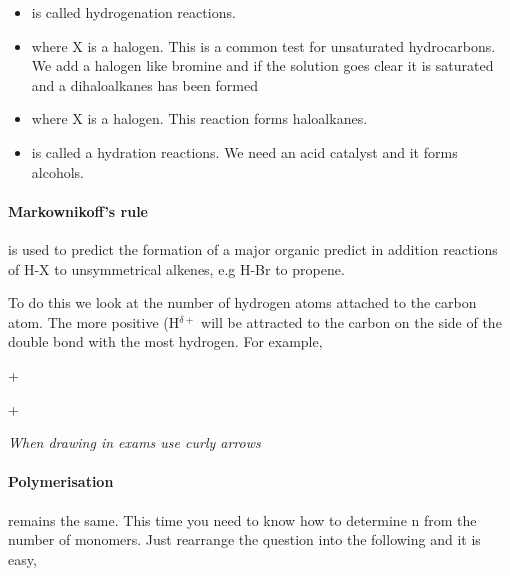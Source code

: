 	\begin{itemize}
		\item {} is called hydrogenation reactions.
		\item {} where X is a halogen. This is a common test for unsaturated hydrocarbons. We add a halogen like bromine and if the solution goes clear it is saturated and a dihaloalkanes has been formed
		\item {} where X is a halogen. This reaction forms haloalkanes.
		\item {} is called a hydration reactions. We need an acid catalyst and it forms alcohols.
	\end{itemize}
	
	
	\paragraph{Markownikoff's rule} is used to predict the formation of a major organic predict in addition reactions of H-X to unsymmetrical alkenes, e.g H-Br to propene.
	
	To do this we look at the number of hydrogen atoms attached to the carbon atom. The more positive (H$^{\delta +}$ will be attracted to the carbon on the side of the double bond with the most hydrogen. For example,
	
	\begin{center}
		 +  \longrightarrow
		
		\vspace{7mm}
		
		 +  \longrightarrow
		
		\vspace{7mm}
		
		
		\vspace{7mm}
		
		\textit{When drawing in exams use curly arrows} %
	\end{center}
	
	\paragraph{Polymerisation} remains the same. This time you need to know how to determine n from the number of monomers. Just rearrange the question into the following and it is easy,
	
